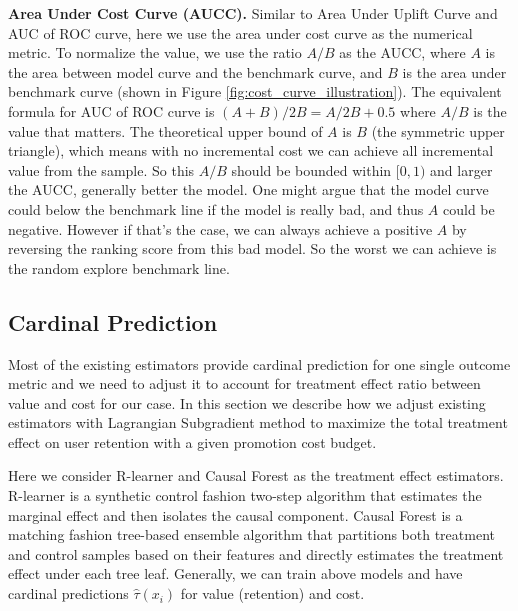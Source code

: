 \textbf{Area Under Cost Curve (AUCC).} Similar to Area Under Uplift Curve and AUC of ROC curve, here we use the area under cost curve as the numerical metric. To normalize the value, we use the ratio $A/B$ as the AUCC, where $A$ is the area between model curve and the benchmark curve, and $B$ is the area under benchmark curve (shown in Figure \ref{fig:cost_curve_illustration}). The equivalent formula for AUC of ROC curve is $(A+B)/2B = A/2B + 0.5$ where $A/B$ is the value that matters. The theoretical upper bound of $A$ is $B$ (the symmetric upper triangle), which means with no incremental cost we can achieve all incremental value from the sample. So this $A/B$ should be bounded within $[0, 1)$ and larger the AUCC, generally better the model. One might argue that the model curve could below the benchmark line if the model is really bad, and thus $A$ could be negative. However if that's the case, we can always achieve a positive $A$ by reversing the ranking score from this bad model. So the worst we can achieve is the random explore benchmark line.

\subsection{Cardinal Prediction}
Most of the existing estimators provide cardinal prediction for one single outcome metric and we need to adjust it to account for treatment effect ratio between value and cost for our case. In this section we describe how we adjust existing estimators with Lagrangian Subgradient method to maximize the total treatment effect on user retention with a given promotion cost budget.

Here we consider R-learner \cite{nie2017quasi} and Causal Forest \cite{wager2017estimation} as the treatment effect estimators. R-learner is a synthetic control fashion two-step algorithm that estimates the marginal effect and then isolates the causal component. Causal Forest is a matching fashion tree-based ensemble algorithm that partitions both treatment and control samples based on their features and directly estimates the treatment effect under each tree leaf. Generally, we can train above models and have cardinal predictions $\hat\tau(x_i)$ for value (retention) and cost. 

